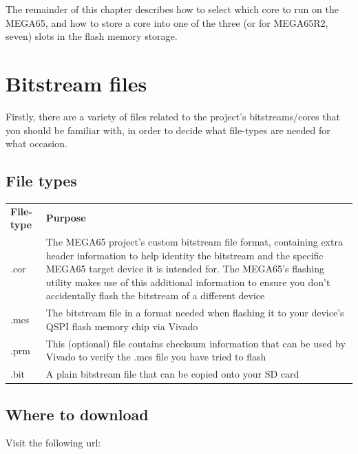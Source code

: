 The remainder of this chapter describes how to select which core to run on the MEGA65, and
how to store a core into one of the three (or for MEGA65R2, seven) slots in the flash memory storage.

\section{Bitstream files}
\label{sec:bitstreamfiles}

Firstly, there are a variety of files related to the project's bitstreams/cores that you should be familiar with, in order to decide what file-types are needed for what occasion.

\subsection{File types}

\begin{center}
  \begin{longtable}{|R{2.2cm}|p{10cm}|}
    \hline
    {\textbf{File-type}} & {\textbf{Purpose}} \\
    \hhline{|=|=|}
    {.cor} & {The MEGA65 project's custom bitstream file format, containing extra header information to help identity the bitstream and the specific MEGA65 target device it is intended for. The MEGA65's flashing utility makes use of this additional information to ensure you don't accidentally flash the bitstream of a different device} \\
    \hline
    {.mcs} & {The bitstream file in a format needed when flashing it to your device's QSPI flash memory chip via Vivado} \\
    \hline
    {.prm} & {This (optional) file contains checksum information that can be used by Vivado to verify the .mcs file you have tried to flash} \\
    \hline
    {.bit} & {A plain bitstream file that can be copied onto your SD card} \\
    \hline
  \end{longtable}
\end{center}

\subsection{Where to download}

Visit the following url:

